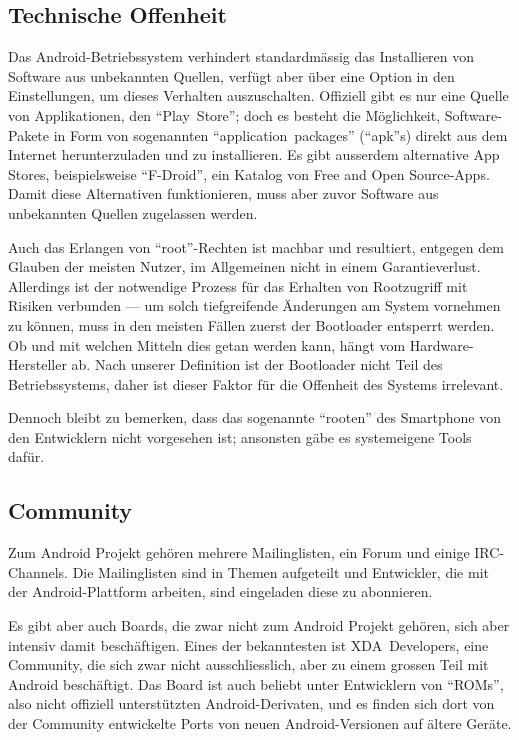 \subsection{Technische Offenheit}
Das \mbox{Android-Betriebssystem} verhindert standardmässig das Installieren von Software aus unbekannten Quellen, verfügt aber über eine Option in den Einstellungen, um dieses Verhalten auszuschalten. Offiziell gibt es nur eine Quelle von Applikationen, den ``\mbox{Play Store}''; doch es besteht die Möglichkeit, \mbox{Software-Pakete} in Form von sogenannten ``\mbox{application packages}'' (``apk''s) direkt aus dem Internet herunterzuladen und zu installieren. Es gibt ausserdem alternative App Stores, beispielsweise ``\mbox{F-Droid}'', ein Katalog von Free and Open \mbox{Source-Apps}\thinspace\cite{online:f-droid}. Damit diese Alternativen funktionieren, muss aber zuvor Software aus unbekannten Quellen zugelassen werden.

Auch das Erlangen von \mbox{``root''-Rechten} ist machbar und resultiert, entgegen dem Glauben der meisten Nutzer, im Allgemeinen nicht in einem Garantieverlust\thinspace\cite{online:xda-rooting-warranty}. Allerdings ist der notwendige Prozess für das Erhalten von Rootzugriff mit Risiken verbunden --- um solch tiefgreifende Änderungen am System vornehmen zu können, muss in den meisten Fällen zuerst der Bootloader entsperrt werden. 
Ob und mit welchen Mitteln dies getan werden kann, hängt vom Hardware-Hersteller ab\thinspace\cite{online:apu-what-is-unlocking}. Nach unserer Definition ist der Bootloader nicht Teil des Betriebssystems, daher ist dieser Faktor für die Offenheit des Systems irrelevant.

Dennoch bleibt zu bemerken, dass das sogenannte ``rooten'' des Smartphone von den Entwicklern nicht vorgesehen ist; ansonsten gäbe es systemeigene Tools dafür.
\newline

\subsection{Community}
Zum Android Projekt gehören mehrere Mailinglisten, ein Forum und einige \mbox{IRC-Channels}\thinspace\cite{online:android-community}. Die Mailinglisten sind in Themen aufgeteilt und Entwickler, die mit der \mbox{Android-Plattform} arbeiten, sind eingeladen diese zu abonnieren\thinspace\cite{online:android-community}.

Es gibt aber auch Boards, die zwar nicht zum Android Projekt gehören, sich aber intensiv damit beschäftigen. Eines der bekanntesten ist \mbox{XDA Developers}\thinspace\cite{online:xda-developers}, eine Community, die sich zwar nicht ausschliesslich, aber zu einem grossen Teil mit Android beschäftigt. Das Board ist auch beliebt unter Entwicklern von ``ROMs'', also nicht offiziell unterstützten Android-Derivaten, und es finden sich dort von der Community entwickelte Ports von neuen Android-Versionen auf ältere Geräte.
\newline

